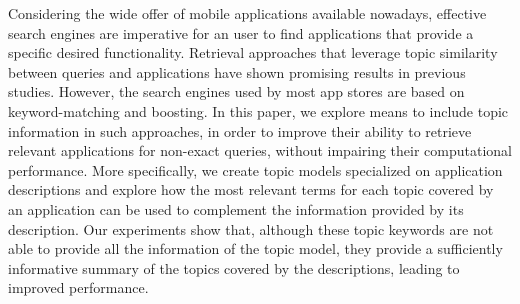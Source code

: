 
Considering the wide offer of mobile applications available nowadays, effective search engines are imperative for an user to find applications that provide a specific desired functionality. Retrieval approaches that leverage topic similarity between queries and applications have shown promising results in previous studies. However, the search engines used by most app stores are based on keyword-matching and boosting. In this paper, we explore means to include topic information in such approaches, in order to improve their ability to retrieve relevant applications for non-exact queries, without impairing their computational performance. More specifically, we create topic models specialized on application descriptions and explore how the most relevant terms for each topic covered by an application can be used to complement the information provided by its description. Our experiments show that, although these topic keywords are not able to provide all the information of the topic model, they provide a sufficiently informative summary of the topics covered by the descriptions, leading to improved performance.


